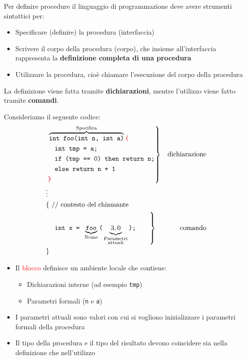\documentclass[a4paper]{article}
\begin{document}
\noindent
Per definire procedure il linguaggio di programmazione deve avere strumenti sintattici
per:
\begin{itemize}
  \item Specificare (definire) la procedura (interfaccia)

  \item Scrivere il corpo della procedura (corpo), che insieme all'interfaccia
    rappresenta la \textbf{definizione completa di una procedura}

  \item Utilizzare la procedura, cioè chiamare l'esecuzione del corpo della procedura
\end{itemize}
La definizione viene fatta tramite \textbf{dichiarazioni}, mentre l'utilizzo viene fatto
tramite \textbf{comandi}.

\begin{Example}{}{}
  Consideriamo il seguente codice:
  \[
    \begin{aligned}
      &\left.\begin{aligned}
        &\overbrace{\texttt{int foo(int n, int a)}}^{\text{Specifica}}
        \texttt{\textcolor{Red}{\{}}\\
        &\quad \texttt{int tmp = a;}\\
        &\quad \texttt{if (tmp == 0) then return n;}\\
        &\quad \texttt{else return n + 1 }\\
        &\texttt{\textcolor{Red}{\}}}
      \end{aligned}\right\} & \text{dichiarazione} \\
      &\vdots \\
      &\text{\{ // contesto del chiamante}\\
      &\left.\quad \texttt{int x = } \underbrace{\texttt{foo}}_{\text{Nome}} \texttt{(} \underbrace{3, 0}_{\substack{\text{Parametri}\\\text{attuali}}}
      \texttt{);}\qquad \right\} & \text{comando}\\
      &\text{\}}
    \end{aligned}
  \] 
  \begin{itemize}
    \item 
      Il \textcolor{Red}{blocco} definisce un ambiente locale che contiene:
      \begin{itemize}
        \item Dichiarazioni interne (ad esempio \texttt{tmp})
        \item Parametri formali (\texttt{n} e \texttt{a})
      \end{itemize}

    \item I parametri attuali sono valori con cui si vogliono inizializzare i parametri
      formali della procedura

    \item Il tipo della procedura e il tipo del risultato devono coincidere sia
      nella definizione che nell'utilizzo
  \end{itemize}
\end{Example}
\end{document}
